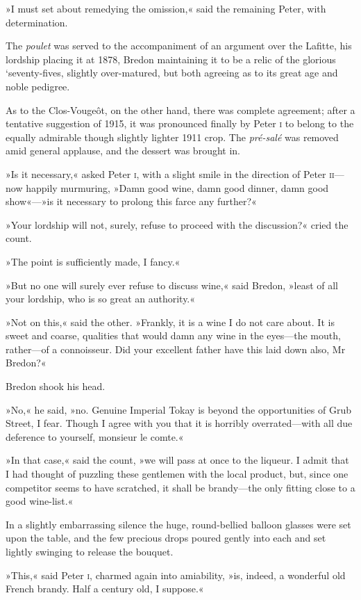 »I must set about remedying the omission,« said the remaining Peter, with determination.

The \textit{poulet} was served to the accompaniment of an argument over the Lafitte, his lordship placing it at 1878, Bredon maintaining it to be a relic of the glorious `seventy-fives, slightly over-matured, but both agreeing as to its great age and noble pedigree.

As to the Clos-Vougeôt, on the other hand, there was complete agreement; after a tentative suggestion of 1915, it was pronounced finally by Peter \textsc{i} to belong to the equally admirable though slightly lighter 1911 crop. The \textit{pré-salé} was removed amid general applause, and the dessert was brought in.

»Is it necessary,« asked Peter \textsc{i}, with a slight smile in the direction of Peter \textsc{ii}—now happily murmuring, »Damn good wine, damn good dinner, damn good show«—»is it necessary to prolong this farce any further?«

»Your lordship will not, surely, refuse to proceed with the discussion?« cried the count.

»The point is sufficiently made, I fancy.«

»But no one will surely ever refuse to discuss wine,« said Bredon, »least of all your lordship, who is so great an authority.«

»Not on this,« said the other. »Frankly, it is a wine I do not care about. It is sweet and coarse, qualities that would damn any wine in the eyes—the mouth, rather—of a connoisseur. Did your excellent father have this laid down also, Mr Bredon?«

Bredon shook his head.

»No,« he said, »no. Genuine Imperial Tokay is beyond the opportunities of Grub Street, I fear. Though I agree with you that it is horribly overrated—with all due deference to yourself, monsieur le comte.«

»In that case,« said the count, »we will pass at once to the liqueur. I admit that I had thought of puzzling these gentlemen with the local product, but, since one competitor seems to have scratched, it shall be brandy—the only fitting close to a good wine-list.«

In a slightly embarrassing silence the huge, round-bellied balloon glasses were set upon the table, and the few precious drops poured gently into each and set lightly swinging to release the bouquet.

»This,« said Peter \textsc{i}, charmed again into amiability, »is, indeed, a wonderful old French brandy. Half a century old, I suppose.«

